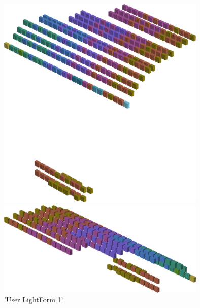 \begin{figure}[H]
    \centering
    \begin{adjustbox}{width=10cm,center}
      \includegraphics[width=10cm]{src/colorspace_patterns/pattern9-45.png}%
    \end{adjustbox}
    \begin{adjustbox}{width=10cm}
      \includegraphics[width=10cm]{src/colorspace_patterns/pattern9-225.png}%
    \end{adjustbox}
\caption{'User LightForm 1'.}
\end{figure}
\clearpage

